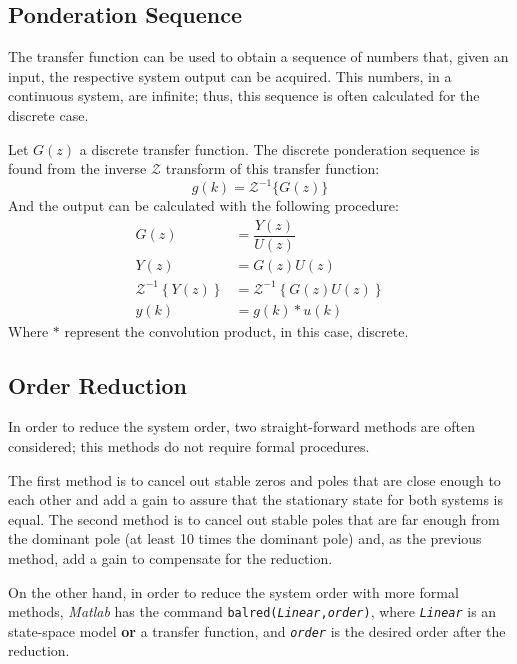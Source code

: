 \subsection{Ponderation Sequence}\label{sec:ponderationSequence}
The transfer function can be used to obtain a sequence of numbers that, given an input, the respective system output can be acquired. This numbers, in a continuous system, are infinite; thus, this sequence is often calculated for the discrete case.

Let $G(z)$ a discrete transfer function. The discrete ponderation sequence is found from the inverse $\mathcal{Z}$ transform of this transfer function:
\begin{equation}
    g(k)=\mathcal{Z}^{-1}\{G(z)\}
\end{equation}
And the output can be calculated with the following procedure:
\begin{equation}
    \begin{split}
        G(z)&=\dfrac{Y(z)}{U(z)}\\
        Y(z)&=G(z)U(z)\\
        \mathcal{Z}^{-1}\left\{Y(z)\right\}&=\mathcal{Z}^{-1}\left\{G(z)U(z)\right\}\\
        y(k)&=g(k)*u(k)
    \end{split}
\end{equation}
Where $*$ represent the convolution product, in this case, discrete.


\subsection{Order Reduction}\label{sec:reduct}
In order to reduce the system order, two straight-forward methods are often considered; this methods do not require formal procedures.

The first method is to cancel out stable zeros and poles that are close enough to each other and add a gain to assure that the stationary state for both systems is equal. The second method is to cancel out stable poles that are far enough from the dominant pole (at least 10 times the dominant pole) and, as the previous method, add a gain to compensate for the reduction.

On the other hand, in order to reduce the system order with more formal methods, \textit{Matlab} has the command \texttt{balred(\textit{Linear},\textit{order})}, where \texttt{\textit{Linear}} is an state-space model \textbf{or} a transfer function, and \texttt{\textit{order}} is the desired order after the reduction.

